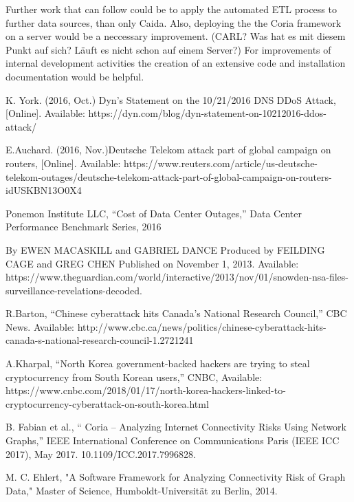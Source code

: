 \documentclass[conference, 11pt]{IEEEtran}
\begin{document}
Further work that can follow could be to apply the automated ETL process to further data sources, than only Caida. Also, deploying the the Coria framework on a server would be a neccessary improvement. (CARL? Was hat es mit diesem Punkt auf sich? Läuft es nicht schon auf einem Server?) For improvements of internal development activities the creation of an extensive code and installation documentation would be helpful.



\begin{thebibliography}{00}
K. York. (2016, Oct.) Dyn’s Statement on the 10/21/2016 DNS DDoS Attack, [Online]. Available: https://dyn.com/blog/dyn-statement-on-10212016-ddos-attack/

E.Auchard. (2016, Nov.)Deutsche Telekom attack part of global campaign on routers, [Online]. Available: https://www.reuters.com/article/us-deutsche-telekom-outages/deutsche-telekom-attack-part-of-global-campaign-on-routers-idUSKBN13O0X4

Ponemon Institute LLC, ``Cost of Data Center Outages,'' Data Center Performance Benchmark Series, 2016 %

 By EWEN MACASKILL and GABRIEL DANCE Produced by FEILDING CAGE and GREG CHEN Published on November 1, 2013. Available: https://www.theguardian.com/world/interactive/2013/nov/01/snowden-nsa-files-surveillance-revelations-decoded.

R.Barton, ``Chinese cyberattack hits Canada's National Research Council,'' CBC News. Available: http://www.cbc.ca/news/politics/chinese-cyberattack-hits-canada-s-national-research-council-1.2721241

A.Kharpal, ``North Korea government-backed hackers are trying to steal cryptocurrency from South Korean users,'' CNBC, Available: https://www.cnbc.com/2018/01/17/north-korea-hackers-linked-to-cryptocurrency-cyberattack-on-south-korea.html

B. Fabian et al., `` Coria – Analyzing Internet Connectivity Risks Using Network Graphs,'' IEEE International Conference on Communications Paris (IEEE ICC 2017), May 2017. 10.1109/ICC.2017.7996828. 

M. C. Ehlert, "A Software Framework for Analyzing Connectivity Risk of Graph Data," Master of Science, Humboldt-Universität zu Berlin, 2014. 


\end{thebibliography}
\end{document}

